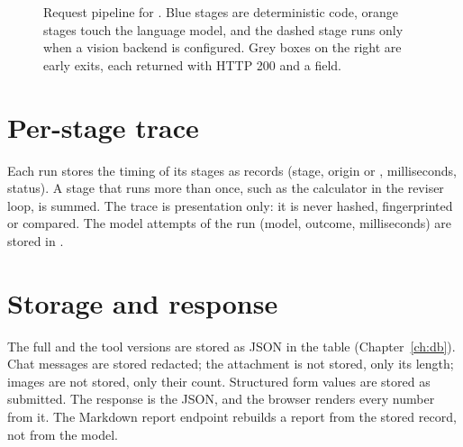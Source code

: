 \begin{figure}[p]
\centering

\caption{Request pipeline for . Blue stages are deterministic code, orange stages touch the language model, and the dashed stage runs only when a vision backend is configured. Grey boxes on the right are early exits, each returned with HTTP 200 and a  field.}
\label{fig:pipeline}
\end{figure}

\section{Per-stage trace}
Each run stores the timing of its stages as  records (stage, origin  or , milliseconds, status). A stage that runs more than once, such as the calculator in the reviser loop, is summed. The trace is presentation only: it is never hashed, fingerprinted or compared. The model attempts of the run (model, outcome, milliseconds) are stored in .

\section{Storage and response}
The full  and the tool versions are stored as JSON in the  table (Chapter~\ref{ch:db}). Chat messages are stored redacted; the attachment is not stored, only its length; images are not stored, only their count. Structured form values are stored as submitted. The response is the  JSON, and the browser renders every number from it. The Markdown report endpoint rebuilds a report from the stored record, not from the model.
